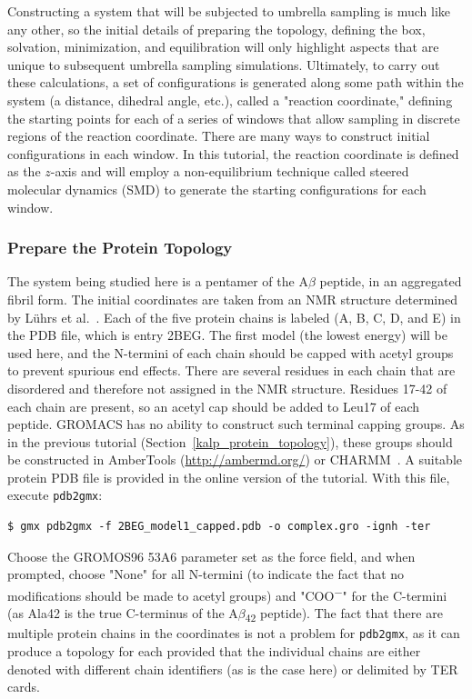\documentclass[9pt,tutorial,pubversion]{livecoms}
\begin{document}
Constructing a system that will be subjected to umbrella sampling is much like any other, so the initial details of preparing the topology, defining the box, solvation, minimization, and equilibration will only highlight aspects that are unique to subsequent umbrella sampling simulations. Ultimately, to carry out these calculations, a set of configurations is generated along some path within the system (a distance, dihedral angle, etc.), called a "reaction coordinate," defining the starting points for each of a series of windows that allow sampling in discrete regions of the reaction coordinate. There are many ways to construct initial configurations in each window. In this tutorial, the reaction coordinate is defined as the $z$-axis and will employ a non-equilibrium technique called steered molecular dynamics (SMD) to generate the starting configurations for each window.

\subsubsection{Prepare the Protein Topology} \label{umbrella_protein_topology}

The system being studied here is a pentamer of the A$\beta$ peptide, in an aggregated fibril form. The initial coordinates are taken from an NMR structure determined by L\"uhrs et al.~\cite{Luhrs2005}. Each of the five protein chains is labeled (A, B, C, D, and E) in the PDB file, which is entry 2BEG. The first model (the lowest energy) will be used here, and the N-termini of each chain should be capped with acetyl groups to prevent spurious end effects. There are several residues in each chain that are disordered and therefore not assigned in the NMR structure. Residues 17-42 of each chain are present, so an acetyl cap should be added to Leu17 of each peptide. GROMACS has no ability to construct such terminal capping groups. As in the previous tutorial (Section~\ref{kalp_protein_topology}), these groups should be constructed in AmberTools (\url{http://ambermd.org/}) or CHARMM~\cite{Brooks2009}. A suitable protein PDB file is provided in the online version of the tutorial. With this file, execute \texttt{pdb2gmx}:

\begin{lstlisting}
$ gmx pdb2gmx -f 2BEG_model1_capped.pdb -o complex.gro -ignh -ter
\end{lstlisting}

Choose the GROMOS96 53A6 parameter set as the force field, and when prompted, choose "None" for all N-termini (to indicate the fact that no modifications should be made to acetyl groups) and "COO\textsuperscript{$-$}" for the C-termini (as Ala42 is the true C-terminus of the A$\beta$\textsubscript{42} peptide). The fact that there are multiple protein chains in the coordinates is not a problem for \texttt{pdb2gmx}, as it can produce a topology for each provided that the individual chains are either denoted with different chain identifiers (as is the case here) or delimited by TER cards.
\end{document}
